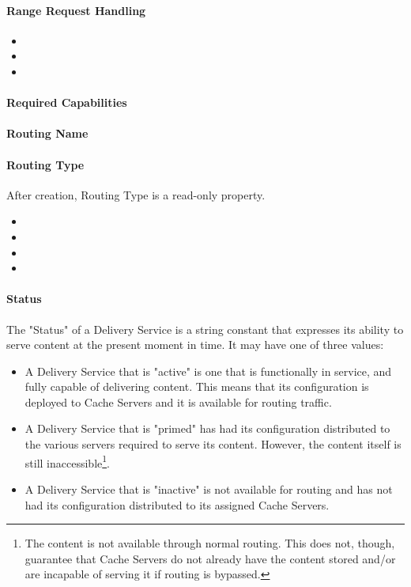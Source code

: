 \paragraph{Range Request Handling}
\begin{itemize}
	\item {}
	\item {}
	\item {}
\end{itemize}


\paragraph{Required Capabilities}

\paragraph{Routing Name}

\paragraph{Routing Type}
After creation, Routing Type is a read-only property.
\begin{itemize}
	\item {}
	\item {}
	\item {}
	\item {}
\end{itemize}

\paragraph{Status}
The "Status" of a Delivery Service is a string constant that expresses its
ability to serve content at the present moment in time. It may have one of three
values:

\begin{itemize}
	\item {} A Delivery Service that is "active" is one that is
	functionally in service, and fully capable of delivering content. This means
	that its configuration is deployed to Cache Servers and it is available for
	routing traffic.
	\item {} A Delivery Service that is "primed" has had its
	configuration distributed to the various servers required to serve its
	content. However, the content itself is still inaccessible\footnote{The
	content is not available through normal routing. This does not, though,
	guarantee that Cache Servers do not already have the content stored and/or
	are incapable of serving it if routing is bypassed.}.
	\item {} A Delivery Service that is "inactive" is not available
	for routing and has not had its configuration distributed to its assigned
	Cache Servers.
\end{itemize}

